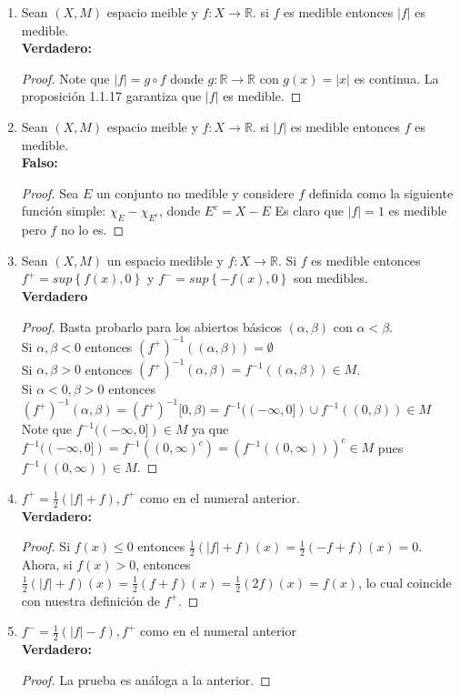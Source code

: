\documentclass[spanish,12pt,a4paper,openany]{book}
\begin{document}
	\begin{enumerate}
		\item  Sean $(X,M)$ espacio meible y $f: X \rightarrow \mathbb{R}.$ si $f$ es medible entonces $|f|$ es medible.\\
		\textbf{Verdadero:}
		\begin{proof}
			Note que $|f| = g \circ f$ donde $g: \mathbb{R} \rightarrow \mathbb{R}$ con  $g(x)=|x|$ es continua. La proposición 1.1.17 garantiza que $|f|$ es medible.
		\end{proof}
		\item Sean $(X,M)$ espacio meible y $f: X \rightarrow \mathbb{R}.$ si $|f|$ es medible entonces $f$ es medible.\\
		\textbf{Falso:}
		\begin{proof}
			Sea $E$ un conjunto no medible y considere $f$ definida como la siguiente función simple: $\chi_{E} - \chi_{E^{c}}$, donde $E^{c} = X-E$
			Es claro que $|f| = 1$ es medible pero $f$ no lo es.
		\end{proof}
		\item Sean $(X,M)$ un espacio medible y $f: X \rightarrow \mathbb{R}$. Si $f$ es medible entonces $f^{+} = sup \left\{ f(x),0 \right\}$ y $f^{-} = sup \left\{-f(x), 0 \right\}$ son medibles.\\
		\textbf{Verdadero}
		\begin{proof}
			Basta probarlo para los abiertos básicos $(\alpha, \beta )$ con $\alpha < \beta$. \\
			Si $\alpha , \beta <0$ entonces $(f^{+})^{-1} ((\alpha, \beta)) = \emptyset$\\
			Si $\alpha, \beta > 0 $ entonces $(f^{+})^{-1} (\alpha, \beta) = f^{-1} ((\alpha, \beta)) \in M$.\\
			Si $\alpha <0, \beta > 0 $ entonces $(f^{+})^{-1} (\alpha, \beta) = (f^{+})^{-1} [0, \beta) = f^{-1} ((-\infty, 0]) \cup f^{-1} ((0, \beta)) \in M$ Note que $f^{-1} ((-\infty, 0]) \in M$ ya que $f^{-1} ((-\infty, 0]) = f^{-1} ((0, \infty)^{c}) = (f^{-1} ((0, \infty)))^{c} \in M$ pues $f^{-1}((0, \infty)) \in M$.
		\end{proof}
		\item $f^{+} = \frac{1}{2} \left(|f| + f \right), f^{+}$ como en el numeral anterior.\\
		\textbf{Verdadero:}
		\begin{proof}
			Si $f(x) \leq 0$ entonces $\frac{1}{2} \left(|f| + f \right) (x) = \frac{1}{2} \left(-f + f \right)(x) = 0$. Ahora, si $f(x)>0$, entonces $\frac{1}{2} \left(|f| + f \right)(x) = \frac{1}{2} \left(f + f \right)(x) = \frac{1}{2}(2f)(x) = f(x)$, lo cual coincide con nuestra definición de $f^{+}$.
		\end{proof}
		\item $f^{-} = \frac{1}{2} \left(|f| - f \right), f^{+}$ como en el numeral anterior\\
		\textbf{Verdadero:}
		\begin{proof}
			La prueba es análoga a la anterior.
		\end{proof}
	\end{enumerate}
\end{document}

